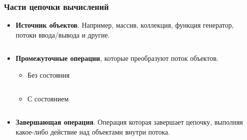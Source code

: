\begin{frame}
\frametitle{Части цепочки вычислений} %
\begin{itemize}
	\item \textbf{Источник объектов}. Например, массив, коллекция, функция генератор, потоки ввода/вывода и другие.
	\inputminted{java}{code/Producer.java}
	\item \textbf{Промежуточные операции}, которые преобразуют поток объектов.
	\begin{itemize}
		\item Без состояния
		\inputminted{java}{code/Stateless.java}
		\item С состоянием
		\inputminted{java}{code/Stateful.java}
	\end{itemize}
	\item \textbf{Завершающая операция}. Операция которая завершает цепочку, выполняя какое-либо действие над объектами внутри потока.
	\inputminted{java}{code/Termination.java}
\end{itemize}
\end{frame}
